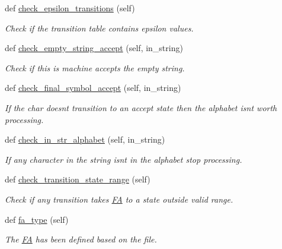 \begin{DoxyCompactItemize}
def \mbox{\hyperlink{classfinite__automaton_1_1_f_a_a50aac0972f155714c805126384813d1f}{check\+\_\+epsilon\+\_\+transitions}} (self)
\begin{DoxyCompactList}\small\item\em Check if the transition table contains epsilon values. \end{DoxyCompactList}\item 
def \mbox{\hyperlink{classfinite__automaton_1_1_f_a_a87734b6c31285c080862a62f00527d97}{check\+\_\+empty\+\_\+string\+\_\+accept}} (self, in\+\_\+string)
\begin{DoxyCompactList}\small\item\em Check if this is machine accepts the empty string. \end{DoxyCompactList}\item 
def \mbox{\hyperlink{classfinite__automaton_1_1_f_a_a1a8126235389c671e1a4f23895154162}{check\+\_\+final\+\_\+symbol\+\_\+accept}} (self, in\+\_\+string)
\begin{DoxyCompactList}\small\item\em If the char doesn\textquotesingle{}t transition to an accept state then the alphabet isn\textquotesingle{}t worth processing. \end{DoxyCompactList}\item 
def \mbox{\hyperlink{classfinite__automaton_1_1_f_a_ae2909d69bb02d15bdf17c808106e35d7}{check\+\_\+in\+\_\+str\+\_\+alphabet}} (self, in\+\_\+string)
\begin{DoxyCompactList}\small\item\em If any character in the string isn\textquotesingle{}t in the alphabet stop processing. \end{DoxyCompactList}\item 
def \mbox{\hyperlink{classfinite__automaton_1_1_f_a_a5807041a61c4627c67836cd425522675}{check\+\_\+transition\+\_\+state\+\_\+range}} (self)
\begin{DoxyCompactList}\small\item\em Check if any transition takes \mbox{\hyperlink{classfinite__automaton_1_1_f_a}{FA}} to a state outside valid range. \end{DoxyCompactList}\item 
def \mbox{\hyperlink{classfinite__automaton_1_1_f_a_a279deb94ddb3198fe1cc36a981f87550}{fa\+\_\+type}} (self)
\begin{DoxyCompactList}\small\item\em The \mbox{\hyperlink{classfinite__automaton_1_1_f_a}{FA}} has been defined based on the file. \end{DoxyCompactList}\item 

\end{DoxyCompactItemize}
